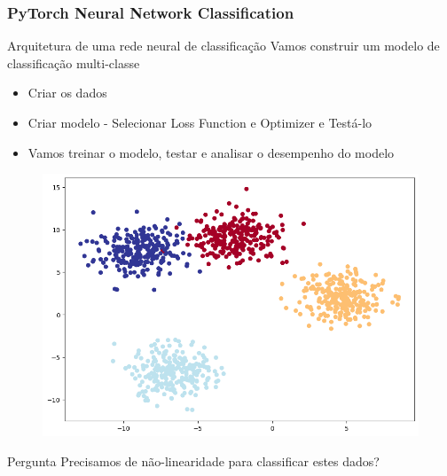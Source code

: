 \documentclass{beamer}
\begin{document}
\begin{frame}
	\frametitle{PyTorch Neural Network Classification}
	\begin{block}{Arquitetura de uma rede neural de classificação}
		Vamos construir um modelo de classificação multi-classe
		\begin{itemize}
			\item Criar os dados
			\item Criar modelo - Selecionar Loss Function e Optimizer e Testá-lo
			\item Vamos treinar o modelo, testar e analisar o desempenho do modelo
		\end{itemize}
		\begin{figure}
			\centering
			\includegraphics[width=0.3\linewidth]{figures/multiclass_example}
		\end{figure}
	\end{block}
\begin{alertblock}{Pergunta}
	Precisamos de não-linearidade para classificar estes dados?
\end{alertblock}
\end{frame}
\end{document}
